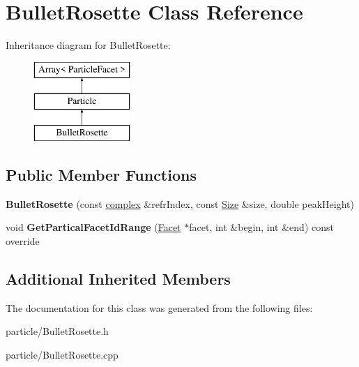 \hypertarget{class_bullet_rosette}{}\section{Bullet\+Rosette Class Reference}
\label{class_bullet_rosette}
Inheritance diagram for Bullet\+Rosette\+:\begin{figure}[H]
\begin{center}
\leavevmode
\includegraphics[height=3.000000cm]{class_bullet_rosette}
\end{center}
\end{figure}
\subsection*{Public Member Functions}
\begin{DoxyCompactItemize}
\item 
\mbox{\label{class_bullet_rosette_ad965a987a9247a0a3b3463b41d9856a9}} 
{\bfseries Bullet\+Rosette} (const \mbox{\hyperlink{classcomplex}{complex}} \&refr\+Index, const \mbox{\hyperlink{struct_size}{Size}} \&size, double peak\+Height)
\item 
\mbox{\label{class_bullet_rosette_ae5b1763e464116c8429b8502d3cb07fa}} 
void {\bfseries Get\+Partical\+Facet\+Id\+Range} (\mbox{\hyperlink{class_facet}{Facet}} $\ast$facet, int \&begin, int \&end) const override
\end{DoxyCompactItemize}
\subsection*{Additional Inherited Members}


The documentation for this class was generated from the following files\+:\begin{DoxyCompactItemize}
\item 
particle/Bullet\+Rosette.\+h\item 
particle/Bullet\+Rosette.\+cpp\end{DoxyCompactItemize}

